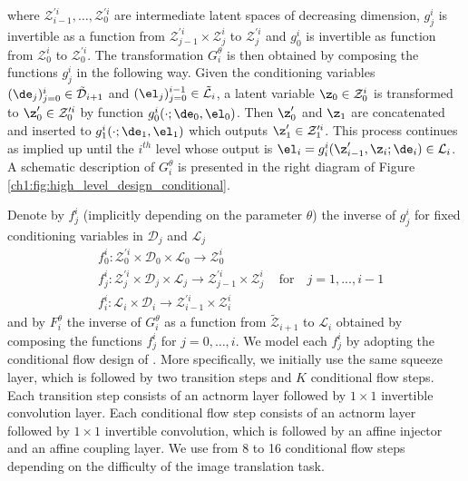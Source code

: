 where $\mathcal{Z}_{i-1}^{\prime i}, \ldots, \mathcal{Z}_0^{\prime i} $ are intermediate latent spaces of decreasing dimension, $g_j^i$ is invertible as a function from $\mathcal{Z}_{j-1}^{\prime i} \times \mathcal{Z}_{j}^i$ to $\mathcal{Z}_{j}^{\prime i}$ and $g_0^i$  is invertible as function from $\mathcal{Z}_0^i$ to $\mathcal{Z}_{0}^{\prime i}$.
The transformation $G^\theta_i$ is then obtained by composing the functions  $g_{j}^{i}$ in the following way. Given the conditioning variables $(\de_j)_{j=0}^i \in \tilde{\mathcal{D}}_{i+1}$ and $(\el_j)_{j=0}^{i-1} \in \tilde{\mathcal{L}}_{i}$, a latent variable $\z_0 \in \mathcal{Z}_0^i$ is transformed to $\z_0' \in \mathcal{Z}_0^{\prime i}$ by function $g^i_0(\cdot ; \de_0, \el_0)$. 
Then $\z_0'$ and $\z_1$ are concatenated and inserted to $g^i_1(\cdot;\de_1, \el_1)$ which outputs $\z_1' \in \mathcal{Z}_1^{\prime i}$. This process continues as implied up until the $i^{th}$ level whose output is $\el_i = g_i^i(\z_{i-1}', \z_i; \de_i) \in \mathcal{L}_{i}$. A schematic description of $G^\theta_i$ is presented in the right diagram of Figure \ref{ch1:fig:high_level_design_conditional}. 

Denote by $f_{j}^{i}$ (implicitly depending on the parameter $\theta$) the inverse of $g_{j}^{i}$ for fixed conditioning variables in $\mathcal{D}_j$ and $\mathcal{L}_j$
\begin{align*}
&f_0^i : \mathcal{Z}_0^{\prime i} \times \mathcal{D}_0 \times \mathcal{L}_0 \rightarrow \mathcal{Z}_0^i \\   
 &  f_{j}^{i}:  \mathcal{Z}_{j}^{\prime i} \times \mathcal{D}_{j} \times  \mathcal{L}_{j} \rightarrow \mathcal{Z}_{j-1}^{\prime i}\times  \mathcal{Z}_{j}^i\, \quad \text{for} \quad j=1,...,i-1\\
&f_{i}^{i}:    \mathcal{L}_{i} \times \mathcal{D}_{i} \rightarrow  \mathcal{Z}_{i-1}^{\prime i}\times \mathcal{Z}_{i}^i
\end{align*}
and by $F_i^\theta$ the inverse of $G_i^\theta$ as a function from $\tilde{\mathcal{Z}}_{i+1}$ to $\mathcal{L}_i$ obtained by composing the functions $f^i_j$ for $j = 0, \ldots, i$.
We model each $f_{j}^{i}$ by adopting the conditional flow design of \cite{SRFLOW}. More specifically, we initially use the same squeeze layer, which is followed by two transition steps and $K$ conditional flow steps. Each transition step consists of an actnorm layer followed by $1\times1$ invertible convolution layer. Each conditional flow step consists of an actnorm layer followed by $1\times1$ invertible convolution, which is followed by an affine injector and an affine coupling layer. We use from 8 to 16 conditional flow steps depending on the difficulty of the image translation task.

